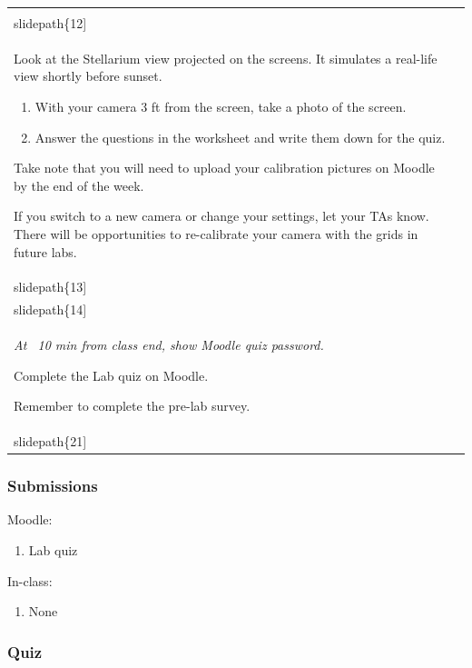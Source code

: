 \documentclass[12pt]{article}
\begin{document}
\begin{longtable}{|m{}|m{}|}
\texttt{[image: \\slidepath\{12]}}\\\hline
Look at the Stellarium view projected on the screens. It simulates a real-life view shortly before sunset. 

\begin{enumerate}
\item With your camera 3 ft from the screen, take a photo of the screen.
\item Answer the questions in the worksheet and write them down for the quiz. 
\end{enumerate}

Take note that you will need to upload your calibration pictures on Moodle by the end of the week. 

If you switch to a new camera or change your settings, let your TAs know. There will be opportunities to re-calibrate your camera with the grids in future labs.
 & \texttt{[image: \\slidepath\{13]}}

\texttt{[image: \\slidepath\{14]}}\\\hline
\emph{At ~10 min from class end, show Moodle quiz password.} 

Complete the Lab quiz on Moodle.

Remember to complete the pre-lab survey. & \texttt{[image: \\slidepath\{21]}}\\\hline
\end{longtable}


\subsubsection{Submissions}

Moodle:
\begin{enumerate}
\item Lab quiz
\end{enumerate}

\noindent
In-class:
\begin{enumerate}
\item None
\end{enumerate}


\subsubsection{Quiz}
\end{document}
